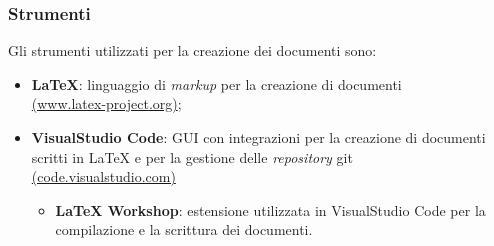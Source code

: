 \subsubsection{Strumenti}
Gli strumenti utilizzati per la creazione dei documenti sono:
\begin{itemize}
	\item \textbf{LaTeX}: linguaggio di \textit{markup} per la creazione di
	      documenti \\
	      \href{https://www.latex-project.org/}{(www.latex-project.org)};
	\item \textbf{VisualStudio Code}: GUI con integrazioni per la creazione di
	      documenti scritti in LaTeX e per la gestione delle \textit{repository\g} git\g \\
	      \href{https://code.visualstudio.com/}{(code.visualstudio.com)}
	      \begin{itemize}
		      \item \textbf{LaTeX Workshop}: estensione utilizzata in
		            VisualStudio Code per la compilazione e la scrittura dei
		            documenti.
	      \end{itemize}
\end{itemize}

